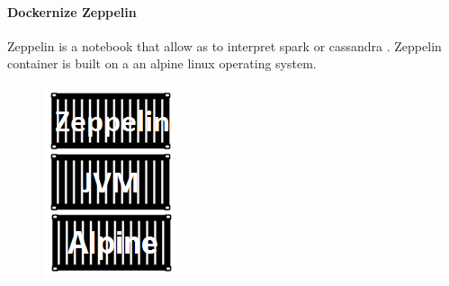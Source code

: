 \paragraph{Dockernize Zeppelin}
Zeppelin is a notebook that allow as to interpret spark or cassandra . Zeppelin container is built on a 
an alpine linux operating system.
\label{sec:sec01}
\begin{figure}[h!]
	\centering
	\includegraphics[height=0.2\textheight]{fig01/ZeppelinContainer}
	\label{fig:FilialesEtClients}
\end{figure}
